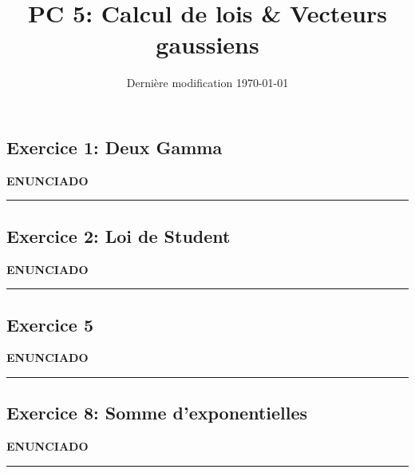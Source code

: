 \documentclass[french]{article}
\begin{document}
	
\title{PC 5: Calcul de lois \& Vecteurs gaussiens}
\date{Dernière modification \today}

\maketitle

\subsection*{Exercice 1: Deux Gamma}
\textbf{ENUNCIADO}
\vspace{.3cm}
\hrule
\vspace{.3cm}
{%
	
}

\newpage

\subsection*{Exercice 2: Loi de Student}
\textbf{ENUNCIADO}
\vspace{.3cm}
\hrule
\vspace{.3cm}
{%
	
}

\newpage

\subsection*{Exercice 5}
\textbf{ENUNCIADO}
\vspace{.3cm}
\hrule
\vspace{.3cm}
{%
	
}

\newpage

\subsection*{Exercice 8: Somme d'exponentielles}
\textbf{ENUNCIADO}
\vspace{.3cm}
\hrule
\vspace{.3cm}
{%
	
}
\end{document}
